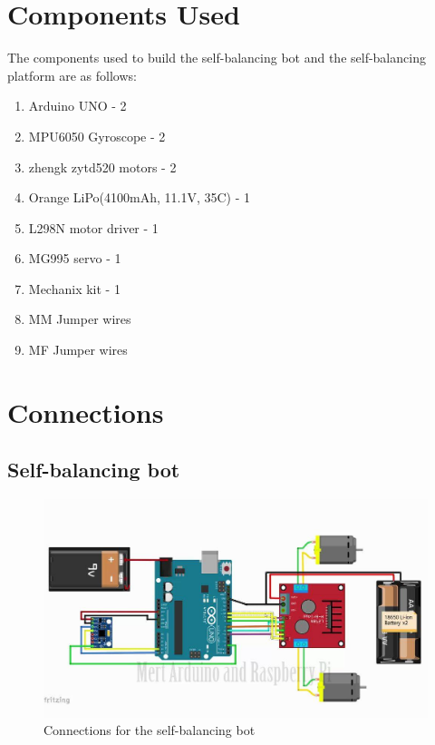 \section{Components Used}

The components used to build the self-balancing bot and the self-balancing platform are as follows:
\begin{enumerate}
  \item Arduino UNO - 2
  \item MPU6050 Gyroscope - 2
  \item zhengk zytd520 motors - 2
  \item Orange LiPo(4100mAh, 11.1V, 35C) - 1
  \item L298N motor driver - 1
  \item MG995 servo - 1
  \item Mechanix kit - 1
  \item MM Jumper wires
  \item MF Jumper wires
\end{enumerate}

\clearpage

\section{Connections}
\subsection{Self-balancing bot}

\begin{figure}[H]
\centering
\includegraphics[width=\textwidth,height=\textheight,keepaspectratio]{images/bot-connections}
\caption{Connections for the self-balancing bot}
\label{fig:connections}
\end{figure}

